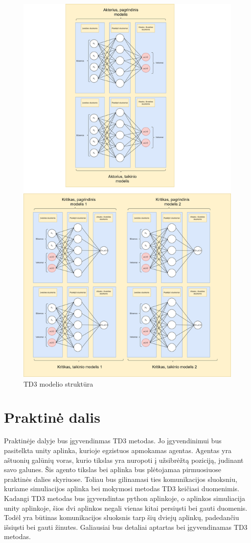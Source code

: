 \documentclass[a4paper, 12pt]{article}
\begin{document}
\newpage
\begin{figure}[h!]
\centering
\includegraphics[width=.7\textwidth]{TD3}
\caption{TD3 modelio struktūra}
\label{TD3Struktura}
\end{figure}

\newpage

\section{Praktinė dalis}

Praktinėje dalyje bus įgyvendinmas TD3 metodas. Jo įgyvendinimui bus pasitelkta unity aplinka, kurioje egzistuos apmokamas agentas. Agentas yra aštuonių galūnių voras, kurio tikslas yra nuropoti į užsibrėžtą poziciją, judinant savo galunes. Šis agento tikslas bei aplinka bus plėtojamaa pirmuosiuose praktinės dalies skyriuose. Toliau bus gilinamasi ties komunikacijos sluoksniu, kuriame simuliacijos aplinka bei mokymosi metodas TD3 keičiasi duomenimis. Kadangi TD3 metodas bus įgyvendintas python aplinkoje, o aplinkos simuliacija unity aplinkoje, šios dvi aplinkos negali vienas kitai persiųsti bei gauti duomenis. Todėl yra būtinas komunikacijos sluoksnis tarp šių dviejų aplinkų, padedančiu išsiųsti bei gauti žinutes. Galiausiai bus detaliai aptartas bei įgyvendinamas TD3 metodas.
\end{document}
